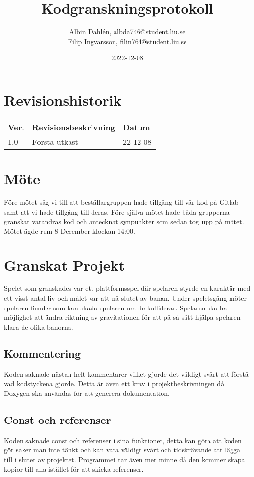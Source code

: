 \documentclass{TDP005mall}
\author{Albin Dahlén, \url{albda746@student.liu.se}\\
  Filip Ingvarsson, \url{filin764@student.liu.se}}
\title{Kodgranskningsprotokoll}
\date{2022-12-08}
\begin{document}
\projectpage
\tableofcontents
\newpage
\section{Revisionshistorik}
\begin{table}[!h]
\begin{tabularx}{\linewidth}{|l|X|l|}
\hline
Ver. & Revisionsbeskrivning & Datum \\\hline
1.0 & Första utkast & 22-12-08 \\\hline
\end{tabularx}
\end{table}

\section{Möte}
Före mötet såg vi till att beställargruppen hade tillgång till vår kod på Gitlab samt att vi hade tillgång till deras.
Före själva mötet hade båda grupperna granskat varandras kod och antecknat synpunkter som sedan tog upp på mötet.
Mötet ägde rum 8 December klockan 14:00.

\section{Granskat Projekt}
Spelet som granskades var ett plattformsspel där spelaren styrde en karaktär med ett visst antal liv och målet var att nå slutet av banan.
Under speletsgång möter spelaren fiender som kan skada spelaren om de kolliderar. Spelaren ska ha möjlighet att ändra riktning av gravitationen för att på så sätt hjälpa spelaren klara de olika banorna.

\subsection{Kommentering}
Koden saknade nästan helt kommentarer vilket gjorde det väldigt svårt att förstå vad kodstyckena gjorde.
Detta är även ett krav i projektbeskrivningen då Doxygen ska användas för att generera dokumentation.

\subsection{Const och referenser}
Koden saknade const och referenser i sina funktioner, detta kan göra att koden gör saker man inte tänkt och kan vara väldigt svårt och tidskrävande att lägga till i slutet av projektet. 
Programmet tar även mer minne då den kommer skapa kopior till alla istället för att skicka referenser.
\end{document}
